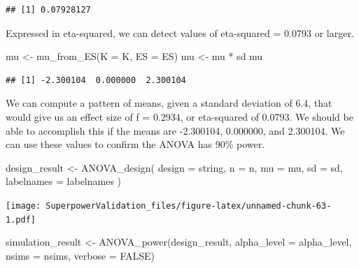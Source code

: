 \documentclass[
]{book}
\newenvironment{Shaded}{\begin{snugshade}}{\end{snugshade}}
\newcommand{\AttributeTok}[1]{\textcolor[rgb]{0.77,0.63,0.00}{#1}}
\newcommand{\ConstantTok}[1]{\textcolor[rgb]{0.00,0.00,0.00}{#1}}
\newcommand{\FunctionTok}[1]{\textcolor[rgb]{0.00,0.00,0.00}{#1}}
\newcommand{\NormalTok}[1]{#1}
\newcommand{\OtherTok}[1]{\textcolor[rgb]{0.56,0.35,0.01}{#1}}
\newcommand{\SpecialCharTok}[1]{\textcolor[rgb]{0.00,0.00,0.00}{#1}}
\begin{document}
\begin{verbatim}
## [1] 0.07928127
\end{verbatim}

Expressed in eta-squared, we can detect values of eta-squared = 0.0793 or larger.

\begin{Shaded}
\begin{Highlighting}[]
\NormalTok{mu }\OtherTok{\textless{}{-}} \FunctionTok{mu\_from\_ES}\NormalTok{(}\AttributeTok{K =}\NormalTok{ K, }\AttributeTok{ES =}\NormalTok{ ES)}
\NormalTok{mu }\OtherTok{\textless{}{-}}\NormalTok{ mu }\SpecialCharTok{*}\NormalTok{ sd}
\NormalTok{mu}
\end{Highlighting}
\end{Shaded}

\begin{verbatim}
## [1] -2.300104  0.000000  2.300104
\end{verbatim}

We can compute a pattern of means, given a standard deviation of 6.4, that would give us an effect size of f = 0.2934, or eta-squared of 0.0793. We should be able to accomplish this if the means are -2.300104, 0.000000, and 2.300104. We can use these values to confirm the ANOVA has 90\% power.

\begin{Shaded}
\begin{Highlighting}[]
\NormalTok{design\_result }\OtherTok{\textless{}{-}} \FunctionTok{ANOVA\_design}\NormalTok{(}
  \AttributeTok{design =}\NormalTok{ string,}
  \AttributeTok{n =}\NormalTok{ n,}
  \AttributeTok{mu =}\NormalTok{ mu,}
  \AttributeTok{sd =}\NormalTok{ sd,}
  \AttributeTok{labelnames =}\NormalTok{ labelnames}
\NormalTok{  )}
\end{Highlighting}
\end{Shaded}

\texttt{[image: SuperpowerValidation\_files/figure-latex/unnamed-chunk-63-1.pdf]}

\begin{Shaded}
\begin{Highlighting}[]
\NormalTok{simulation\_result }\OtherTok{\textless{}{-}} \FunctionTok{ANOVA\_power}\NormalTok{(design\_result,}
                                 \AttributeTok{alpha\_level =}\NormalTok{ alpha\_level,}
                                 \AttributeTok{nsims =}\NormalTok{ nsims,}
                                 \AttributeTok{verbose =} \ConstantTok{FALSE}\NormalTok{)}
\end{Highlighting}
\end{Shaded}
\end{document}
